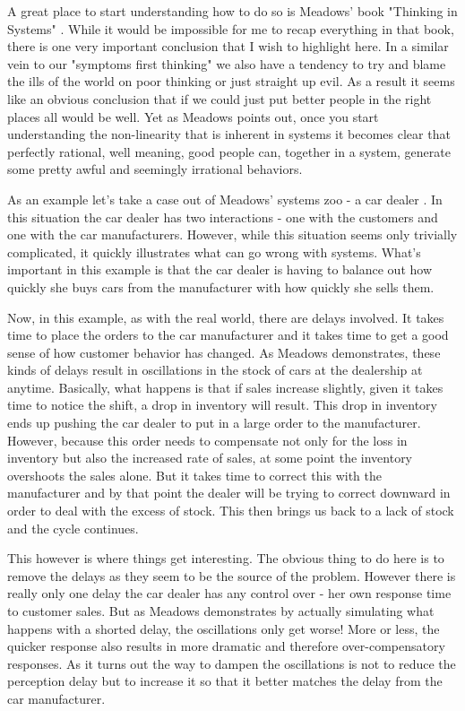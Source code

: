 \documentclass[11pt]{book}
\begin{document}
A great place to start understanding how to do so is Meadows' book "Thinking in Systems" \cite{meadows}. While it would be impossible for me to recap everything in that book, there is one very important conclusion that I wish to highlight here. In a similar vein to our "symptoms first thinking" we also have a tendency to try and blame the ills of the world on poor thinking or just straight up evil. As a result it seems like an obvious conclusion that if we could just put better people in the right places all would be well. Yet as Meadows points out, once you start understanding the non-linearity that is inherent in systems it becomes clear that perfectly rational, well meaning, good people can, together in a system, generate some pretty awful and seemingly irrational behaviors. 
\newline 

As an example let's take a case out of Meadows' systems zoo - a car dealer \cite{meadows}. In this situation the car dealer has two interactions - one with the customers and one with the car manufacturers. However, while this situation seems only trivially complicated, it quickly illustrates what can go wrong with systems. What's important in this example is that the car dealer is having to balance out how quickly she buys cars from the manufacturer with how quickly she sells them.
\newline

Now, in this example, as with the real world, there are delays involved. It takes time to place the orders to the car manufacturer and it takes time to get a good sense of how customer behavior has changed. As Meadows demonstrates, these kinds of delays result in oscillations in the stock of cars at the dealership at anytime. Basically, what happens is that if sales increase slightly, given it takes time to notice the shift, a drop in inventory will result. This drop in inventory ends up pushing the car dealer to put in a large order to the manufacturer. However, because this order needs to compensate not only for the loss in inventory but also the increased rate of sales, at some point the inventory overshoots the sales alone. But it takes time to correct this with the manufacturer and by that point the dealer will be trying to correct downward in order to deal with the excess of stock. This then brings us back to a lack of stock and the cycle continues.
\newline

This however is where things get interesting. The obvious thing to do here is to remove the delays as they seem to be the source of the problem. However there is really only one delay the car dealer has any control over - her own response time to customer sales. But as Meadows demonstrates by actually simulating what happens with a shorted delay, the oscillations only get worse! More or less, the quicker response also results in more dramatic and therefore over-compensatory responses. As it turns out the way to dampen the oscillations is not to reduce the perception delay but to increase it so that it better matches the delay from the car manufacturer.
\newline
\end{document}
